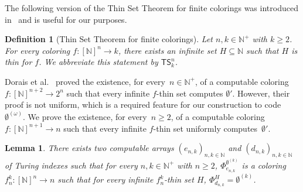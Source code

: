 \documentclass{article}
\newcommand{\TS}[0]{\mathsf{TS}}
\newcommand{\NN}[0]{\mathbb{N}}
\numberwithin{theorem}{section}
\newtheorem{lemma}[theorem]{Lemma}
\newtheorem{definition}[theorem]{Definition}
\newcommand{\lorenzo}[1]{\textcolor{orange}{#1}}
\begin{document}
The following version of the Thin Set Theorem for finite colorings was introduced in~\cite{dorais2016uniform} and is useful for our purposes.

\begin{definition}[Thin Set Theorem for finite colorings]\label{def:ts-finite}
Let $n, k\in \NN^+$ with $k\geq 2$. For every coloring $f : [\NN]^n \to k$, there exists an infinite set $H \subseteq \NN$ such that $H$ is thin for $f$. We abbreviate this statement by $\TS^n_{k}$.
\end{definition}

Dorais et al.~\cite[Proposition 5.5]{dorais2016uniform} proved the existence, for every~$n \in \NN^+$, of a computable coloring $f : [\NN]^{n+2} \to 2^n$ such that every infinite $f$-thin set computes $\emptyset'$. However, their proof is not uniform, which is a required feature for our construction to code $\emptyset^{(\omega)}$. We prove the existence, for every~$n \geq 2$, of a computable coloring $f : [\NN]^{n+1} \to n$ such that every infinite $f$-thin set uniformly computes~$\emptyset'$.


\begin{lemma}\label{lem:arrays}
    There exists two computable arrays $(e_{n,k})_{n,k \in \NN}$ and $(d_{n,k})_{n,k \in \NN}$ of Turing indexes such that for every $n, k \in \NN^+$ with $n \geq 2$, $\Phi_{e_{n,k}}^{\emptyset^{(k)}}$ is a coloring $f_n^k : [\NN]^{n} \to n$ such that for every infinite $f_n^k$-thin set $H$, $\Phi_{d_{n,k}}^{H} = \emptyset^{(k)}$.
\end{lemma}
\end{document}
